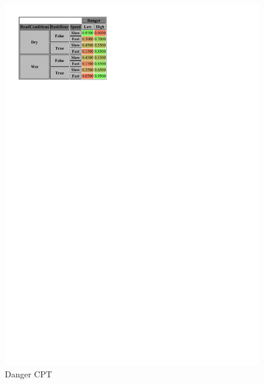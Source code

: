 \documentclass[a4paper,12pt]{article} %
\begin{document}
\begin{figure}[H]
\begin{center}
\begin{minipage}[c]{.45\textwidth}
		\includegraphics[width=\linewidth]{../code/danger.pdf}	
		\caption*{Danger CPT}
		\label{fig:danger}
	\end{minipage}
	\end{center}
	\end{figure}
	
\end{document}
